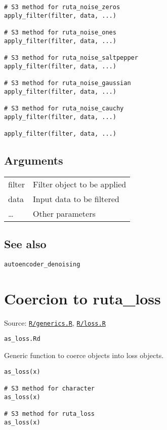 \begin{verbatim}
# S3 method for ruta_noise_zeros
apply_filter(filter, data, ...)

# S3 method for ruta_noise_ones
apply_filter(filter, data, ...)

# S3 method for ruta_noise_saltpepper
apply_filter(filter, data, ...)

# S3 method for ruta_noise_gaussian
apply_filter(filter, data, ...)

# S3 method for ruta_noise_cauchy
apply_filter(filter, data, ...)

apply_filter(filter, data, ...)
\end{verbatim}

\hypertarget{arguments}{\subsection{\texorpdfstring{\protect\hyperlink{arguments}{}Arguments}{Arguments}}\label{arguments}}

\begin{longtable}[c]{@{}>{\small}p{3cm}>{\raggedright}p{12.5cm}@{}}
\toprule
filter & Filter object to be applied\tabularnewline
data & Input data to be filtered\tabularnewline
\ldots{} & Other parameters\tabularnewline
\bottomrule
\end{longtable}

\hypertarget{see-also}{\subsection{\texorpdfstring{\protect\hyperlink{see-also}{}See
also}{See also}}\label{see-also}}

\texttt{autoencoder\_denoising}

\section{Coercion to ruta\_loss}\label{coercion-to-rutaux5floss}

Source:
\href{https://github.com/fdavidcl/ruta/blob/master/R/generics.R}{\texttt{R/generics.R}},
\href{https://github.com/fdavidcl/ruta/blob/master/R/loss.R}{\texttt{R/loss.R}}

\texttt{as\_loss.Rd}

Generic function to coerce objects into loss objects.

\begin{verbatim}
as_loss(x)

# S3 method for character
as_loss(x)

# S3 method for ruta_loss
as_loss(x)
\end{verbatim}

